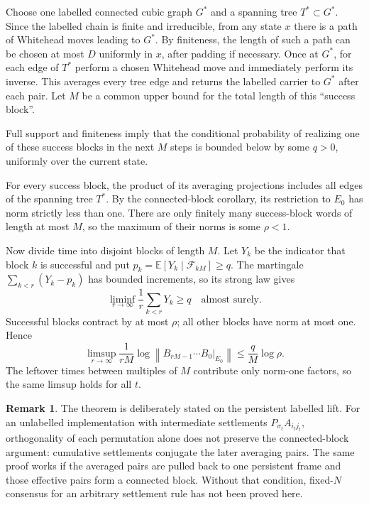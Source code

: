 \documentclass[11pt]{article}
\makeatletter
\newcommand{\E}{\mathbb E}
\newcommand{\norm}[1]{\left\|#1\right\|}
\theoremstyle{definition}
\newtheorem{remark}[theorem]{Remark}
\renewenvironment{proof}[1][\proofname]{\par
  \pushQED{\qed}%
  \normalfont \topsep6\p@\@plus6\p@\relax
  \trivlist
  \item[\hskip\labelsep\bfseries #1\@addpunct{.}]\ignorespaces
}{%
  \popQED\endtrivlist\@endpefalse
}
\makeatother
\begin{document}
\begin{proof}
Choose one labelled connected cubic graph $G^\ast$ and a spanning tree
$T^\ast\subset G^\ast$.  Since the labelled chain is finite and irreducible,
from any state $x$ there is a path of Whitehead moves leading to $G^\ast$.  By
finiteness, the length of such a path can be chosen at most $D$ uniformly in
$x$, after padding if necessary.  Once at $G^\ast$, for each edge of
$T^\ast$ perform a chosen Whitehead move and immediately perform its inverse.
This averages every tree edge and returns the labelled carrier to $G^\ast$
after each pair.  Let $M$ be a
common upper bound for the total length of this ``success block''.

Full support and finiteness imply that the conditional probability of realizing
one of these success blocks in the next $M$ steps is bounded below by some
$q>0$, uniformly over the current state.

For every success block, the product of its averaging projections includes all
edges of the spanning tree $T^\ast$.  By the connected-block corollary, its
restriction to $E_0$ has norm strictly less than one.  There are only finitely
many success-block words of length at most $M$, so the maximum of their norms is
some $\rho<1$.

Now divide time into disjoint blocks of length $M$.  Let $Y_k$ be the indicator
that block $k$ is successful and put
$p_k=\E[Y_k\mid\mathcal F_{kM}]\ge q$.  The martingale
$\sum_{k<r}(Y_k-p_k)$ has bounded increments, so its strong law
\cite{williams,durrett} gives
\[
    \liminf_{r\to\infty}\frac1r\sum_{k<r}Y_k\ge q
    \quad\text{almost surely}.
\]
Successful blocks contract by at most $\rho$; all other blocks have norm at
most one.  Hence
\[
    \limsup_{r\to\infty}
    \frac1{rM}\log\norm{B_{rM-1}\cdots B_0|_{E_0}}
    \le
    \frac{q}{M}\log\rho.
\]
The leftover times between multiples of $M$ contribute only norm-one factors,
so the same limsup holds for all $t$.
\end{proof}

\begin{remark}
The theorem is deliberately stated on the persistent labelled lift.  For an
unlabelled implementation with intermediate settlements
$P_{\sigma_t}A_{i_tj_t}$, orthogonality of each permutation alone does not
preserve the connected-block argument: cumulative settlements conjugate the
later averaging pairs.  The same proof works if the averaged pairs are pulled
back to one persistent frame and those effective pairs form a connected block.
Without that condition, fixed-$N$ consensus for an arbitrary settlement rule
has not been proved here.
\end{remark}
\end{document}
